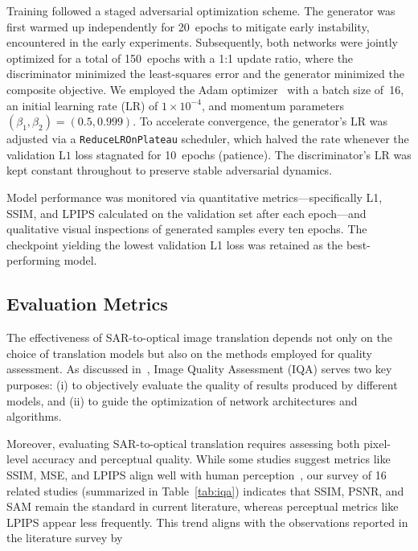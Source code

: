 Training followed a staged adversarial optimization scheme. The generator was first warmed up independently for 20~epochs to mitigate early instability, encountered in the early experiments. Subsequently, both networks were jointly optimized for a total of 150~epochs with a 1:1 update ratio, where the discriminator minimized the least-squares error and the generator minimized the composite objective. We employed the Adam optimizer~\cite{adam_optimizer_2017} with a batch size of~16, an initial learning rate (\(\mathrm{LR}\)) of \(1\times10^{-4}\), and momentum parameters \((\beta_1, \beta_2) = (0.5, 0.999)\). To accelerate convergence, the generator's \(\mathrm{LR}\) was adjusted via a \texttt{ReduceLROnPlateau} scheduler, which halved the rate whenever the validation \(\mathrm{L1}\) loss stagnated for 10~epochs (patience). The discriminator's \(\mathrm{LR}\) was kept constant throughout to preserve stable adversarial dynamics.

Model performance was monitored via quantitative metrics—specifically L1, SSIM, and LPIPS calculated on the validation set after each epoch—and qualitative visual inspections of generated samples every ten epochs. The checkpoint yielding the lowest validation L1 loss was retained as the best-performing model.


\subsection{Evaluation Metrics}
\label{sec:evaluation_metrics}
The effectiveness of SAR-to-optical image translation depends not only on the choice of translation models but also on the methods employed for quality assessment. As discussed in~\cite{quality_assessment_S2OT}, Image Quality Assessment (IQA) serves two key purposes: (i) to objectively evaluate the quality of results produced by different models, and (ii) to guide the optimization of network architectures and algorithms.

Moreover, evaluating SAR-to-optical translation requires assessing both pixel-level accuracy and perceptual quality. While some studies suggest metrics like SSIM, MSE, and LPIPS align well with human perception~\cite{quality_assessment_S2OT}, our survey of 16 related studies (summarized in Table~\ref{tab:iqa}) indicates that SSIM, PSNR, and SAM remain the standard in current literature, whereas perceptual metrics like LPIPS appear less frequently. This trend aligns with the observations reported in the literature survey by~\cite{sar_2_opt_CGAN_survey_taxonomy}

